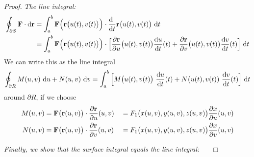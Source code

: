 \begin{proof}
\bigskip
\noindent
\emph{The line integral:}\ \ \ 
\begin{align*}
\oint_{\partial S}\vF\cdot \dee{\vr}
&=\int_a^b\vF\Big(\vr\big(u(t),v(t)\big)\Big)\cdot\diff{\hfill}{t}
\vr\big(u(t),v(t)\big)\ \dee{t} \\
&=\int_a^b\vF\Big(\vr\big(u(t),v(t)\big)\Big)\cdot\Big[
\frac{\partial\vr}{\partial u}\big(u(t),v(t)\big)\diff{u}{t}(t)
+\frac{\partial\vr}{\partial v}\big(u(t),v(t)\big)\diff{v}{t}(t)\Big]\ \dee{t}
\end{align*}
We can write this as the line integral
\begin{equation*}
\oint_{\partial R}M(u,v)\ \dee{u}+N(u,v)\ \dee{v}
=\int_a^b \Big[M\big(u(t),v(t)\big)\ \diff{u}{t}(t)
+N\big(u(t),v(t))\ \diff{v}{t}(t)\Big]\ \dee{t}
\end{equation*}
around $\partial R$, if we choose
\begin{alignat*}{3}
M(u,v)&=\mathbf{F}\big(\mathbf{r}(u,v)\big)\cdot\frac{\partial\mathbf{r}}{\partial u}(u,v)
&&=F_1\big({x(u,v),y(u,v),z(u,v)}\big)\frac{\partial x}{\partial u}(u,v)\\
N(u,v)&=\mathbf{F}\big(\mathbf{r}(u,v)\big)\cdot\frac{\partial\mathbf{r}}{\partial v}(u,v)
&&=F_1\big({x(u,v),y(u,v),z(u,v)}\big)\frac{\partial x}{\partial v}(u,v)
\end{alignat*}

\bigskip
\noindent
\emph{Finally, we show that the surface integral equals the line integral:}\ \ \


\end{proof}
